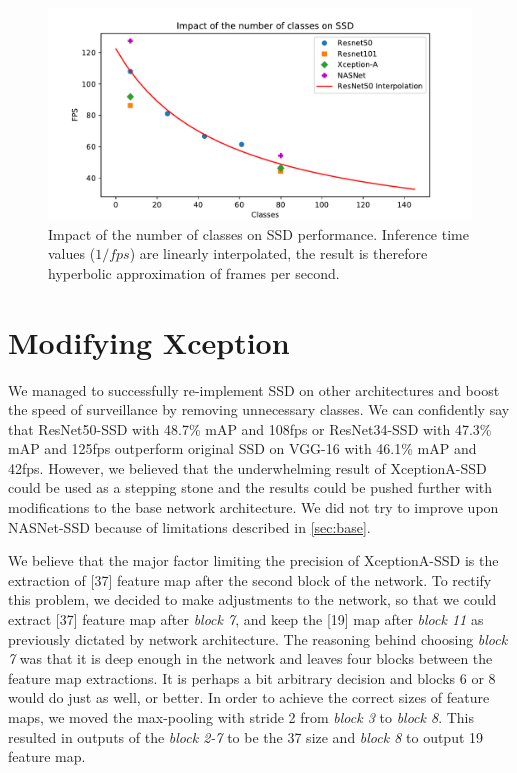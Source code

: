 \begin{figure}
    \centering
    \includegraphics[width=\textwidth]{img/fps_cls}
    \caption[Impact of the number of classes on SSD performance]{Impact of the number of classes on SSD performance. Inference time values ($1/fps$) are linearly interpolated, the result is therefore hyperbolic approximation of frames per second.}
    \label{fig:fpscls}
\end{figure}


\section{Modifying Xception}
\label{sec:fixxception}
We managed to successfully re-implement SSD on other architectures and boost the speed of surveillance by removing unnecessary classes. We can confidently say that ResNet50-SSD with 48.7\% mAP and 108fps or ResNet34-SSD with 47.3\% mAP and 125fps outperform original SSD on VGG-16 with 46.1\% mAP and 42fps. However, we believed that the underwhelming result of XceptionA-SSD could be used as a stepping stone and the results could be pushed further with modifications to the base network architecture. We did not try to improve upon NASNet-SSD because of limitations described in \cref{sec:base}.

We believe that the major factor limiting the precision of XceptionA-SSD is the extraction of [37] feature map after the second block of the network. To rectify this problem, we decided to make adjustments to the network, so that we could extract [37] feature map after \textit{block 7}, and keep the [19] map after \textit{block 11} as previously dictated by network architecture. The reasoning behind choosing \textit{block 7} was that it is deep enough in the network and leaves four blocks between the feature map extractions. It is perhaps a bit arbitrary decision and blocks 6 or 8 would do just as well, or better.  In order to achieve the correct sizes of feature maps, we moved the max-pooling with stride 2 from \textit{block 3} to \textit{block 8}. This resulted in outputs of the \textit{block 2-7} to be the 37 size and \textit{block 8} to output 19 feature map. 

